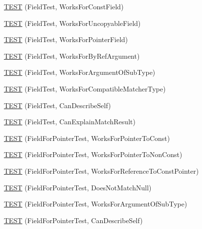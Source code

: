 \begin{DoxyCompactItemize}
\item 
\hyperlink{namespacetesting_1_1gmock__matchers__test_a065efc397a420d3dde87909b4a9a6285}{T\+E\+ST} (Field\+Test, Works\+For\+Const\+Field)
\item 
\hyperlink{namespacetesting_1_1gmock__matchers__test_ac26d681f09865b0727ca32343d974907}{T\+E\+ST} (Field\+Test, Works\+For\+Uncopyable\+Field)
\item 
\hyperlink{namespacetesting_1_1gmock__matchers__test_a56b1c75b98aaa5c9d3a6dec2d3ba30dc}{T\+E\+ST} (Field\+Test, Works\+For\+Pointer\+Field)
\item 
\hyperlink{namespacetesting_1_1gmock__matchers__test_afcb890c159493e250477408a453b08d1}{T\+E\+ST} (Field\+Test, Works\+For\+By\+Ref\+Argument)
\item 
\hyperlink{namespacetesting_1_1gmock__matchers__test_ae720452c3587433e26bea2ea7e91f8e6}{T\+E\+ST} (Field\+Test, Works\+For\+Argument\+Of\+Sub\+Type)
\item 
\hyperlink{namespacetesting_1_1gmock__matchers__test_a27058ed7297742f08419bc5feb3ef687}{T\+E\+ST} (Field\+Test, Works\+For\+Compatible\+Matcher\+Type)
\item 
\hyperlink{namespacetesting_1_1gmock__matchers__test_ac43583cb3c4221aa6bd0132c2cb3fed6}{T\+E\+ST} (Field\+Test, Can\+Describe\+Self)
\item 
\hyperlink{namespacetesting_1_1gmock__matchers__test_ae1279ce8e2a3a6c6f0d4dbe436c9da02}{T\+E\+ST} (Field\+Test, Can\+Explain\+Match\+Result)
\item 
\hyperlink{namespacetesting_1_1gmock__matchers__test_af5c12cdd12f8778074ad0714b83858ed}{T\+E\+ST} (Field\+For\+Pointer\+Test, Works\+For\+Pointer\+To\+Const)
\item 
\hyperlink{namespacetesting_1_1gmock__matchers__test_ac339a26bf6100a2eb2dd4bf908f8448c}{T\+E\+ST} (Field\+For\+Pointer\+Test, Works\+For\+Pointer\+To\+Non\+Const)
\item 
\hyperlink{namespacetesting_1_1gmock__matchers__test_a603253edc7a2310c8a1db225cb589a99}{T\+E\+ST} (Field\+For\+Pointer\+Test, Works\+For\+Reference\+To\+Const\+Pointer)
\item 
\hyperlink{namespacetesting_1_1gmock__matchers__test_a06a1c8d949707ab606627e9f6efe87b9}{T\+E\+ST} (Field\+For\+Pointer\+Test, Does\+Not\+Match\+Null)
\item 
\hyperlink{namespacetesting_1_1gmock__matchers__test_a5447541a290e16a81aec6dd975983d57}{T\+E\+ST} (Field\+For\+Pointer\+Test, Works\+For\+Argument\+Of\+Sub\+Type)
\item 
\hyperlink{namespacetesting_1_1gmock__matchers__test_a056670af8fc7bd3dfd170435dbf08c3c}{T\+E\+ST} (Field\+For\+Pointer\+Test, Can\+Describe\+Self)

\end{DoxyCompactItemize}
